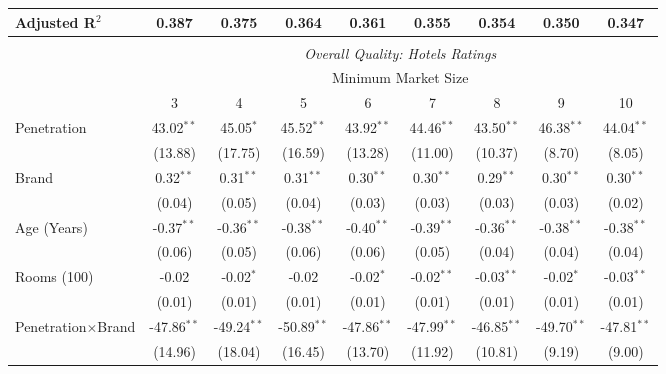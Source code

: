 \begin{table}[!htbp]
{\begin{tabular}{@{\extracolsep{5pt}}lcccccccc}
Adjusted R$^{2}$ & 0.387 & 0.375 & 0.364 & 0.361 & 0.355 & 0.354 & 0.350 & 0.347 \\
\hline 
\\[-1.8ex]
& \multicolumn{8}{c}{\textit{Overall Quality: Hotels Ratings}} \\ 
\cline{2-9} 
& \multicolumn{8}{c}{Minimum Market Size} \\
& 3 & 4 & 5 & 6 & 7 & 8 & 9 & 10\\ 
\hline 
 Penetration & 43.02$^{**}$ & 45.05$^{*}$ & 45.52$^{**}$ & 43.92$^{**}$ & 44.46$^{**}$ & 43.50$^{**}$ & 46.38$^{**}$ & 44.04$^{**}$ \\ 
  & (13.88) & (17.75) & (16.59) & (13.28) & (11.00) & (10.37) & (8.70) & (8.05) \\
 Brand & 0.32$^{**}$ & 0.31$^{**}$ & 0.31$^{**}$ & 0.30$^{**}$ & 0.30$^{**}$ & 0.29$^{**}$ & 0.30$^{**}$ & 0.30$^{**}$ \\ 
  & (0.04) & (0.05) & (0.04) & (0.03) & (0.03) & (0.03) & (0.03) & (0.02) \\ 
 Age (Years) & -0.37$^{**}$ & -0.36$^{**}$ & -0.38$^{**}$ & -0.40$^{**}$ & -0.39$^{**}$ & -0.36$^{**}$ & -0.38$^{**}$ & -0.38$^{**}$ \\ 
  & (0.06) & (0.05) & (0.06) & (0.06) & (0.05) & (0.04) & (0.04) & (0.04) \\ 
 Rooms (100) & -0.02 & -0.02$^{*}$ & -0.02 & -0.02$^{*}$ & -0.02$^{**}$ & -0.03$^{**}$ & -0.02$^{*}$ & -0.03$^{**}$ \\ 
  & (0.01) & (0.01) & (0.01) & (0.01) & (0.01) & (0.01) & (0.01) & (0.01) \\ 
 Penetration$\times$Brand & -47.86$^{**}$ & -49.24$^{**}$ & -50.89$^{**}$ & -47.86$^{**}$ & -47.99$^{**}$ & -46.85$^{**}$ & -49.70$^{**}$ & -47.81$^{**}$ \\ 
  & (14.96) & (18.04) & (16.45) & (13.70) & (11.92) & (10.81) & (9.19) & (9.00) \\ 
 

\end{tabular}}
\end{table}

